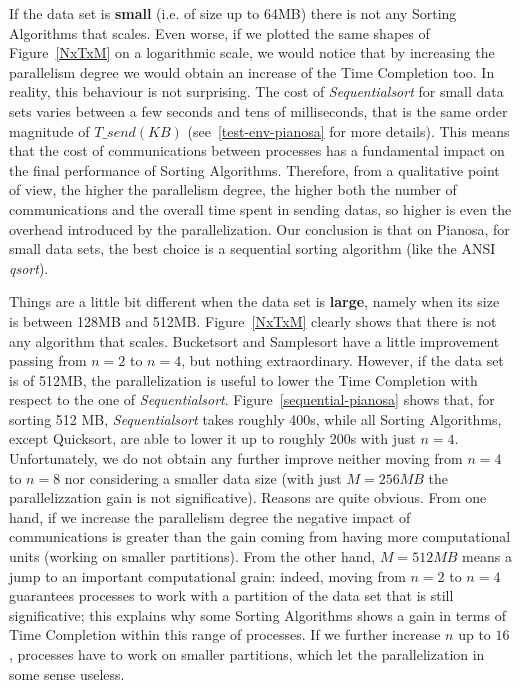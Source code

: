 If the data set is \textbf{small} (i.e. of size up to 64MB) there is not any Sorting Algorithms that scales. Even worse, if we plotted the same shapes of Figure~\ref{NxTxM} on a logarithmic scale, we would notice that by increasing the parallelism degree we would obtain an increase of the Time Completion too. In reality, this behaviour is not surprising. The cost of \textit{Sequentialsort} for small data sets varies between a few seconds and tens of milliseconds, that is the same order magnitude of $T\_send( KB )$ (see~\ref{test-env-pianosa} for more details). This means that the cost of communications between processes has a fundamental impact on the final performance of Sorting Algorithms. Therefore, from a qualitative point of view, the higher the parallelism degree, the higher both the number of communications and the overall time spent in sending datas, so higher is even the overhead introduced by the parallelization. Our conclusion is that on Pianosa, for small data sets, the best choice is a sequential sorting algorithm (like the ANSI \textit{qsort}).

Things are a little bit different when the data set is \textbf{large}, namely when its size is between 128MB and 512MB. Figure~\ref{NxTxM} clearly shows that there is not any algorithm that scales. Bucketsort and Samplesort have a little improvement passing from $n=2$ to $n=4$, but nothing extraordinary. However, if the data set is of 512MB, the parallelization is useful to lower the Time Completion with respect to the one of \textit{Sequentialsort}. Figure~\ref{sequential-pianosa} shows that, for sorting 512 MB, \textit{Sequentialsort} takes roughly 400s, while all Sorting Algorithms, except Quicksort, are able to lower it up to roughly 200s with just $n=4$. Unfortunately, we do not obtain any further improve neither moving from $n=4$ to $n=8$ nor considering a smaller data size (with just $M=256MB$ the parallelizzation gain is not significative). Reasons are quite obvious. From one hand, if we increase the parallelism degree the negative impact of communications is greater than the gain coming from having more computational units (working on smaller partitions).  From the other hand, $M=512MB$ means a jump to an important computational grain: indeed, moving from $n=2$ to $n=4$ guarantees processes to work with a partition of the data set that is still significative; this explains why some Sorting Algorithms shows a gain in terms of Time Completion within this range of processes. If we further increase $n$ up to $16$, processes have to work on smaller partitions, which let the parallelization in some sense useless.

